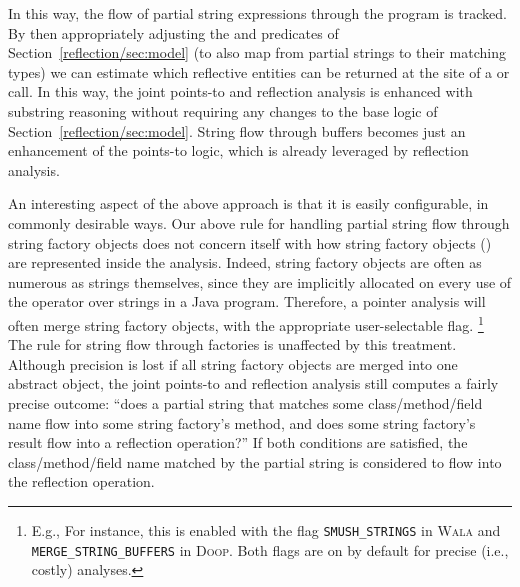 In this way, the flow of partial string expressions through the
program is tracked. By then appropriately adjusting the
 and  predicates of
Section~\ref{reflection/sec:model} (to also map from partial strings to their
matching types) we can estimate which reflective entities can be
returned at the site of a  or  call.  In
this way, the joint points-to and reflection analysis is enhanced with
substring reasoning without requiring any changes to the base logic of
Section~\ref{reflection/sec:model}. String flow through buffers becomes just
an enhancement of the points-to logic, which is already leveraged
by reflection analysis.


An interesting aspect of the above approach is that it is easily
configurable, in commonly desirable ways. Our above rule for handling
partial string flow through string factory objects does not concern
itself with how string factory objects () are represented
inside the analysis. Indeed, string factory objects are often as
numerous as strings themselves, since they are implicitly allocated on
every use of the \code{+} operator over strings in a Java program.
Therefore, a pointer analysis will often merge string factory objects,
with the appropriate user-selectable flag.%
\footnote{E.g., For instance, this is enabled with the flag
  \texttt{SMUSH\_STRINGS} in \textsc{Wala} \cite{www:wala-reflection}
  and \texttt{MERGE\_STRING\_BUFFERS} in \textsc{Doop}.  Both flags
  are on by default for precise (i.e., costly) analyses.}
The rule for string flow through
factories is unaffected by this treatment. Although precision is lost
if all string factory objects are merged into one abstract object, the
joint points-to and reflection analysis still computes a fairly
precise outcome: ``does a partial string that matches some
class/method/field name flow into some string factory's 
method, and does some string factory's  result flow into
a reflection operation?'' If both conditions are satisfied, the
class/method/field name matched by the partial string is considered to
flow into the reflection operation.

